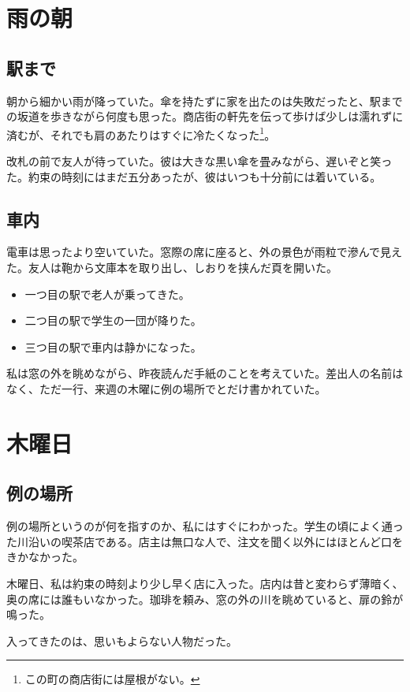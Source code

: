 \documentclass[tate,book,paper=a5,fontsize=10pt,sidenote_length=6zw]{jlreq}
\begin{document}
\chapter{雨の朝}
\section{駅まで}
朝から細かい雨が降っていた。傘を持たずに家を出たのは失敗だったと、駅までの坂道を歩きながら何度も思った。商店街の軒先を伝って歩けば少しは濡れずに済むが、それでも肩のあたりはすぐに冷たくなった\footnote{この町の商店街には屋根がない。}。

改札の前で友人が待っていた。彼は大きな黒い傘を畳みながら、遅いぞと笑った。約束の時刻にはまだ五分あったが、彼はいつも十分前には着いている。

\section{車内}
電車は思ったより空いていた。窓際の席に座ると、外の景色が雨粒で滲んで見えた。友人は鞄から文庫本を取り出し、しおりを挟んだ頁を開いた。
\begin{itemize}
\item 一つ目の駅で老人が乗ってきた。
\item 二つ目の駅で学生の一団が降りた。
\item 三つ目の駅で車内は静かになった。
\end{itemize}
私は窓の外を眺めながら、昨夜読んだ手紙のことを考えていた。差出人の名前はなく、ただ一行、来週の木曜に例の場所でとだけ書かれていた。

\chapter{木曜日}
\section{例の場所}
例の場所というのが何を指すのか、私にはすぐにわかった。学生の頃によく通った川沿いの喫茶店である。店主は無口な人で、注文を聞く以外にはほとんど口をきかなかった。

木曜日、私は約束の時刻より少し早く店に入った。店内は昔と変わらず薄暗く、奥の席には誰もいなかった。珈琲を頼み、窓の外の川を眺めていると、扉の鈴が鳴った。

入ってきたのは、思いもよらない人物だった。
\end{document}
